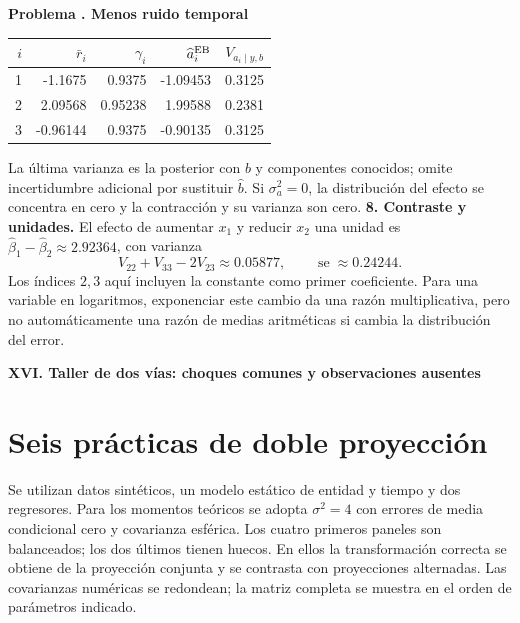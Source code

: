 \documentclass[11pt,a4paper]{article}
\theoremstyle{definition}
\newcommand{\parte}[1]{\par\bigskip\Needspace{8\baselineskip}\begin{center}{\Large\bfseries\color{azul}#1}\end{center}}
\newcounter{problema}
\newenvironment{resuelto}[1]{\refstepcounter{problema}\par\medskip\Needspace{6\baselineskip}\textbf{Problema \theproblema. #1}\par}{\par\medskip}
\DeclareMathOperator{\se}{se}
\begin{document}
\begin{resuelto}{Menos ruido temporal}
\begin{center}\small
\begin{tabular}{rrrrr}
\toprule
$i$&$\bar r_i$&$\gamma_i$&$\widehat a_i^{\rm EB}$&$V_{a_i\mid y,b}$\\
\midrule
1&-1.1675&0.9375&-1.09453&0.3125\\
2&2.09568&0.95238&1.99588&0.2381\\
3&-0.96144&0.9375&-0.90135&0.3125\\
\bottomrule
\end{tabular}
\end{center}
La última varianza es la posterior con $b$ y componentes conocidos; omite incertidumbre adicional por sustituir $\widehat b$. Si $\sigma_a^2=0$, la distribución del efecto se concentra en cero y la contracción y su varianza son cero.
\textbf{8. Contraste y unidades.} El efecto de aumentar $x_1$ y reducir $x_2$ una unidad es $\widehat\beta_1-\widehat\beta_2\approx2.92364$, con varianza
\[
V_{22}+V_{33}-2V_{23}\approx0.05877,\qquad \se\approx0.24244.
\]
Los índices $2,3$ aquí incluyen la constante como primer coeficiente. Para una variable en logaritmos, exponenciar este cambio da una razón multiplicativa, pero no automáticamente una razón de medias aritméticas si cambia la distribución del error.
\end{resuelto}


\parte{XVI. Taller de dos vías: choques comunes y observaciones ausentes}
\section{Seis prácticas de doble proyección}
Se utilizan datos sintéticos, un modelo estático de entidad y tiempo y dos regresores. Para los momentos teóricos se adopta $\sigma^2=4$ con errores de media condicional cero y covarianza esférica. Los cuatro primeros paneles son balanceados; los dos últimos tienen huecos. En ellos la transformación correcta se obtiene de la proyección conjunta y se contrasta con proyecciones alternadas. Las covarianzas numéricas se redondean; la matriz completa se muestra en el orden de parámetros indicado.
\end{document}
